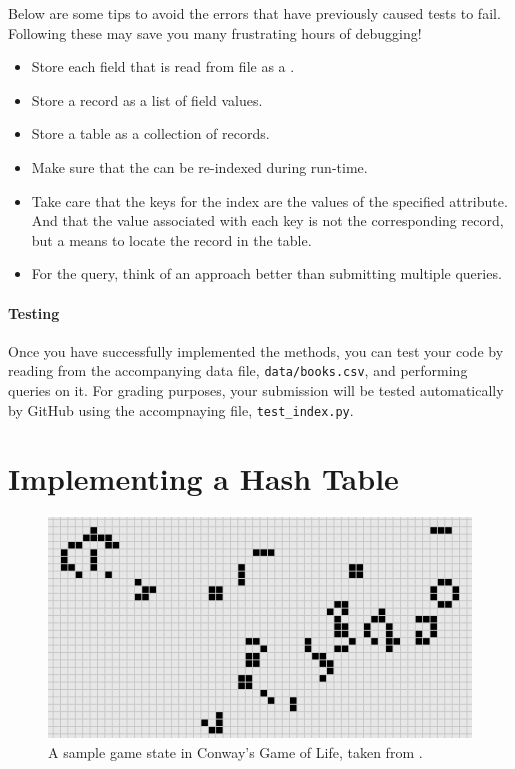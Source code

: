\documentclass[addpoints]{exam}
\begin{document}
  Below are some tips to avoid the errors that have previously caused tests to fail. Following these may save you many frustrating hours of debugging!
  \begin{itemize}
  \item Store each field that is read from file as a .
  \item Store a record as a list of field values.
  \item Store a table as a collection of records.
  \item Make sure that the  can be re-indexed during run-time.
  \item Take care that the keys for the index are the values of the specified attribute. And that the value associated with each key is not the corresponding record, but a means to locate the record in the table.
  \item For the  query, think of an approach better than submitting multiple  queries.
  \end{itemize}

  \subsection{Testing}

  Once you have successfully implemented the methods, you can test your code by reading from the accompanying data file, \texttt{data/books.csv}, and performing queries on it. For grading purposes, your submission will be tested automatically by GitHub using the accompnaying  file, \texttt{test\_index.py}.

\newpage
\part{Implementing a Hash Table}
  
\begin{figure}[!h]
  \centering
  \includegraphics[scale=.8]{banner}
  \caption{A sample game state in Conway's Game of Life, taken from \cite{chaos}.} %
\end{figure}
\end{document}
